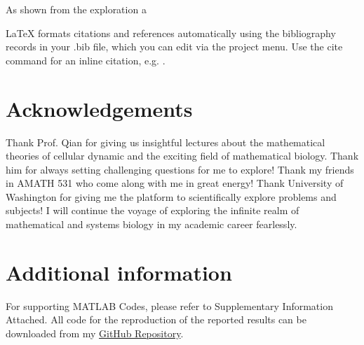 \documentclass[fleqn,10pt]{wlscirep}
\begin{document}
As shown from the exploration a





\noindent LaTeX formats citations and references automatically using the bibliography records in your .bib file, which you can edit via the project menu. Use the cite command for an inline citation, e.g.  \cite{Figueredo:2009dg}.

\section*{Acknowledgements}

Thank Prof. Qian for giving us insightful lectures about the mathematical theories of cellular dynamic and the exciting field of mathematical biology. Thank him for always setting challenging questions for me to explore! Thank my friends in AMATH 531 who come along with me in great energy! Thank University of Washington for giving me the platform to scientifically explore problems and subjects! I will continue the voyage of exploring the infinite realm of mathematical and systems biology in my academic career fearlessly.

\section*{Additional information}

For supporting MATLAB Codes, please refer to Supplementary Information Attached. All code for the reproduction of the reported results can be downloaded from my \href{https://github.com/doerlbh/RNAi_CME_Dynamics}{GitHub Repository}.
\end{document}
